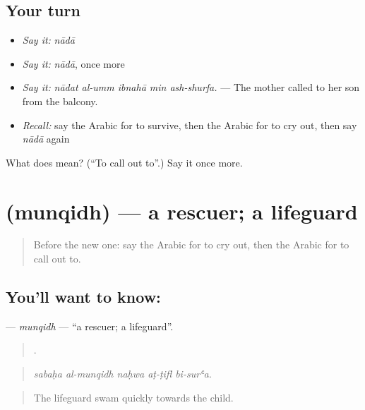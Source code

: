 \subsection*{Your turn}
\begin{itemize}
\raggedright
  \item \emph{Say it:} \emph{nādā}
  \item \emph{Say it:} \emph{nādā}, once more
  \item \emph{Say it:} \emph{nādat al-umm ibnahā min ash-shurfa.} — The mother called to her son from the balcony.
  \item \emph{Recall:} say the Arabic for to survive, then the Arabic for to cry out, then say \emph{nādā} again
\end{itemize}

\begin{tcolorbox}[breakable,colback=teal!4,colframe=teal!35!black,title={Before you move on}]
What does  mean? (\textquotedblleft{}To call out to\textquotedblright{}.) Say it once more.
\end{tcolorbox}
\section[\texorpdfstring{\ar{منقذ} (munqidh)}{منقذ (munqidh)}]{ (munqidh) — a rescuer; a lifeguard}

\label{lesson:AR-C310-munqidh}



\begin{quote}
Before the new one: say the Arabic for to cry out, then the Arabic for to call out to.
\end{quote}

\subsection*{You'll want to know: }
\textbf{} — \emph{munqidh} — \textquotedblleft{}a rescuer; a lifeguard\textquotedblright{}.

\begin{quote}
    .
\end{quote}

\begin{quote}
\emph{sabaḥa al-munqidh naḥwa aṭ-ṭifl bi-surʿa.}
\end{quote}

\begin{quote}
The lifeguard swam quickly towards the child.
\end{quote}

